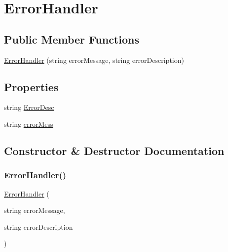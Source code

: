 \hypertarget{classWildLifeTracker_1_1Utility_1_1ErrorHandler}{}\section{Error\+Handler}
\label{classWildLifeTracker_1_1Utility_1_1ErrorHandler}
\subsection*{Public Member Functions}
\begin{DoxyCompactItemize}
\item 
\hyperlink{classWildLifeTracker_1_1Utility_1_1ErrorHandler_abd5196a598ed1d50314664f0993242f8}{Error\+Handler} (string error\+Message, string error\+Description)
\end{DoxyCompactItemize}
\subsection*{Properties}
\begin{DoxyCompactItemize}
\item 
string \hyperlink{classWildLifeTracker_1_1Utility_1_1ErrorHandler_a99e6e8d0590f2455a2d5df4bcd620700}{Error\+Desc}
\item 
string \hyperlink{classWildLifeTracker_1_1Utility_1_1ErrorHandler_abe9394119736c4856e64d035a36f987e}{error\+Mess}
\end{DoxyCompactItemize}


\subsection{Constructor \& Destructor Documentation}
\mbox{\label{classWildLifeTracker_1_1Utility_1_1ErrorHandler_abd5196a598ed1d50314664f0993242f8}} 
\subsubsection{\texorpdfstring{Error\+Handler()}{ErrorHandler()}}
{\footnotesize\ttfamily \hyperlink{classWildLifeTracker_1_1Utility_1_1ErrorHandler}{Error\+Handler} (\begin{DoxyParamCaption}\item[{string}]{error\+Message,  }\item[{string}]{error\+Description }\end{DoxyParamCaption})\hspace{0.3cm}{\ttfamily [inline]}}



